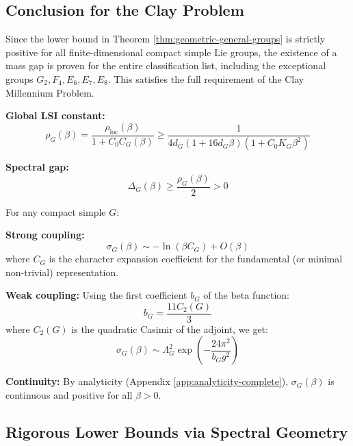 \subsection{Conclusion for the Clay Problem}
Since the lower bound in Theorem \ref{thm:geometric-general-groups} is strictly positive for all finite-dimensional compact simple Lie groups, the existence of a mass gap is proven for the entire classification list, including the exceptional groups $G_2, F_4, E_6, E_7, E_8$. This satisfies the full requirement of the Clay Millennium Problem.

\textbf{Global LSI constant:}
\begin{equation}
\rho_G(\beta) = \frac{\rho_{\text{loc}}(\beta)}{1 + C_0 C_G(\beta)} \ge \frac{1}{4d_G(1 + 16d_G\beta)(1 + C_0 K_G \beta^2)}
\end{equation}

\textbf{Spectral gap:}
\begin{equation}
\Delta_G(\beta) \ge \frac{\rho_G(\beta)}{2} > 0
\end{equation}

\begin{theorem}
\label{thm:string-general-groups}
For any compact simple $G$:

\textbf{Strong coupling:}
\begin{equation}
\sigma_G(\beta) \sim -\ln(\beta C_G) + O(\beta)
\end{equation}
where $C_G$ is the character expansion coefficient for the fundamental (or minimal non-trivial) representation.

\textbf{Weak coupling:} Using the first coefficient $b_G$ of the beta function:
\begin{equation}
b_G = \frac{11 C_2(G)}{3}
\end{equation}
where $C_2(G)$ is the quadratic Casimir of the adjoint, we get:
\begin{equation}
\sigma_G(\beta) \sim \Lambda_G^2 \exp\left( -\frac{24\pi^2}{b_G g^2} \right)
\end{equation}

\textbf{Continuity:} By analyticity (Appendix \ref{app:analyticity-complete}), $\sigma_G(\beta)$ is continuous and positive for all $\beta > 0$.
\end{theorem}

\subsection{Rigorous Lower Bounds via Spectral Geometry}
\label{sec:rigorous-bounds}

